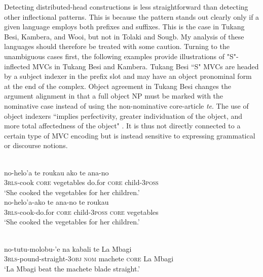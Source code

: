 Detecting distributed-head constructions is less straightforward than detecting other inflectional patterns. This is because the pattern stands out clearly only if a given language employs both prefixes and suffixes. This is the case in Tukang Besi, Kambera, and Wooi, but not in Tolaki and Sougb. My analysis of these languages should therefore be treated with some caution. Turning to the unambiguous cases first, the following examples provide illustrations of "S"-inflected MVCs in Tukang Besi and Kambera. Tukang Besi ``S" MVCs are headed by a subject indexer in the prefix slot and may have an object pronominal form at the end of the complex. Object agreement in Tukang Besi changes the argument alignment in that a full object NP must be marked with the nominative case instead of using the non-nominative core-article \textit{te}. The use of object indexers ``implies perfectivity, greater individuation of the object, and more total affectedness of the object" \citep[135]{donohue1999}. It is thus not directly connected to a certain type of MVC encoding but is instead sensitive to expressing grammatical or discourse notions.

\ea \label{tukang001}
\\
\ea
\gll no-helo'a te roukau ako te ana-no \\
3\textsc{rls}-cook \textsc{core} vegetables do.for \textsc{core} child-3\textsc{poss} \\
\glft `She cooked the vegetables for her children.' \\ 
\ex \label{tukang001b}
\gll no-helo'a-ako te ana-no te roukau \\ 
3\textsc{rls}-cook-do.for \textsc{core} child-3\textsc{poss} \textsc{core} vegetables \\
\glft `She cooked the vegetables for her children.' \\ 
\z
\z

\ea \label{tukang002}
\\
\gll no-tutu-molobu-'e na kabali te La Mbagi \\
3\textsc{rls}-pound-straight-3\textsc{obj} \textsc{nom} machete \textsc{core} La Mbagi \\
\glft `La Mbagi beat the machete blade straight.' \\ 
\z

